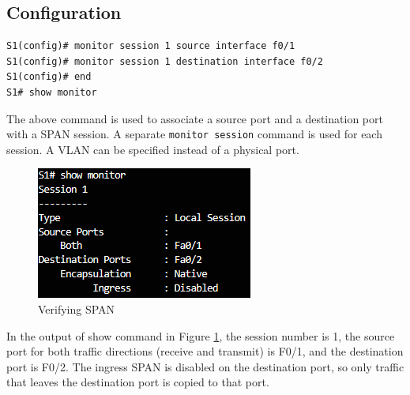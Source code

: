 \subsection{Configuration}

\begin{verbatim}
S1(config)# monitor session 1 source interface f0/1
S1(config)# monitor session 1 destination interface f0/2
S1(config)# end
S1# show monitor
\end{verbatim}

The above command is used to associate a source port and a destination port with a SPAN session. A separate \verb|monitor session| command is used for each session. A VLAN can be specified instead of a physical port.

\begin{figure}[hbtp]
\caption{Verifying SPAN}\label{SPAN}
\centering
\includegraphics[scale=0.8]{pictures/SPAN.PNG}
\end{figure}

In the output of show command in Figure \ref{SPAN}, the session number is 1, the source port for both traffic directions (receive and transmit) is F0/1, and the destination port is F0/2. The ingress SPAN is disabled on the destination port, so only traffic that leaves the destination port is copied to that port.

